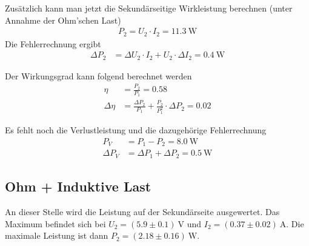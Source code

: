 \documentclass{article}
\newcommand{\W}{\text{W}}
\newcommand{\V}{\text{V}}
\newcommand{\A}{\text{A}}
\begin{document}
Zusätzlich kann man jetzt die Sekundärseitige Wirkleistung berechnen (unter Annahme der Ohm'schen Last)
\begin{align*}
P_2 = U_2\cdot I_2 = 11.3~\text{W}
\end{align*}
Die Fehlerrechnung ergibt
\begin{align*}
\Delta P_2 &= \Delta U_2\cdot I_2 + U_2\cdot \Delta I_2 = 0.4~\W
\end{align*}


Der Wirkungsgrad kann folgend berechnet werden
\begin{align*}
\eta &= \frac{P_2}{P_1} = 0.58 \\
\Delta \eta &= \frac{\Delta P_2}{P_1} + \frac{P_2}{P_1^2}\cdot \Delta P_2 = 0.02
\end{align*}

Es fehlt noch die Verlustleistung und die dazugehörige Fehlerrechnung
\begin{align*}
P_V &= P_1-P_2 = 8.0~\W\\
\Delta P_V &= \Delta P_1 + \Delta P_2 = 0.5~\W
\end{align*}


\subsection{Ohm + Induktive Last}
\label{sec_ohm_induktiv_2}

An dieser Stelle wird die Leistung auf der Sekundärseite ausgewertet. Das Maximum befindet sich bei $U_2=(5.9 \pm 0.1)~\V$ und $I_2=(0.37 \pm 0.02)~\A$. Die maximale Leistung ist dann $P_2=(2.18 \pm 0.16) ~\W$.
\end{document}
